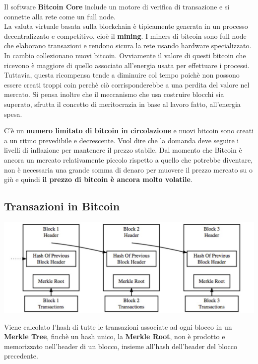 Il software \textbf{Bitcoin Core} include un motore di verifica di transazione e si connette alla rete come un full node. \\

La valuta virtuale basata sulla blockchain è tipicamente generata in un processo decentralizzato e competitivo, cioè il \textbf{mining}. I miners di bitcoin sono full node che elaborano transazioni e rendono sicura la rete usando hardware specializzato. In cambio collezionano nuovi bitcoin. Ovviamente il valore di questi bitcoin che ricevono è maggiore di quello associato all'energia usata per effettuare i processi. Tuttavia, questa ricompensa tende a diminuire col tempo poichè non possono essere creati troppi coin perchè ciò corrisponderebbe a una perdita del valore nel mercato. Si pensa inoltre che il meccanismo che usa costruire blocchi sia superato, sfrutta il concetto di meritocrazia in base al lavoro fatto, all'energia spesa.

C'è un \textbf{numero limitato di bitcoin in circolazione} e nuovi bitcoin sono creati a un ritmo prevedibile e decrescente. Vuol dire che la domanda deve seguire i livelli di inflazione per mantenere il prezzo stabile. Dal momento che Bitcoin è ancora un mercato relativamente piccolo rispetto a quello che potrebbe diventare, non è necessaria una grande somma di denaro per muovere il prezzo mercato su o giù e quindi \textbf{il prezzo di bitcoin è ancora molto volatile}. 

\subsection{Transazioni in Bitcoin}
\begin{center}
    \includegraphics[scale=0.4]{Images/Blockchain/BlocchiBitcoin.jpg}
\end{center}
Viene calcolato l'hash di tutte le transazioni associate ad ogni blocco in un \textbf{Merkle Tree}, finchè un hash unico, la \textbf{Merkle Root}, non è prodotto e memorizzato nell'header di un blocco, insieme all'hash dell'header del blocco precedente. 

